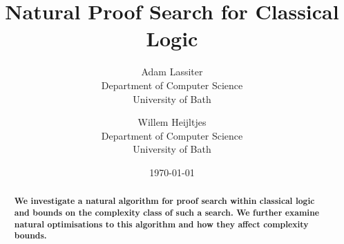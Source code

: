 

\title{Natural Proof Search for Classical Logic}
\author{Adam Lassiter\\Department of Computer Science\\University of Bath \and Willem Heijltjes\\Department of Computer Science\\University of Bath}
\date{\today}



    \maketitle
    \begin{abstract}
        \textbf{
            We investigate a natural algorithm for proof search within classical logic and bounds on the complexity class of such a search.
            We further examine natural optimisations to this algorithm and how they affect complexity bounds.
        }
    \end{abstract}

    

    
 
    

    

    

    


